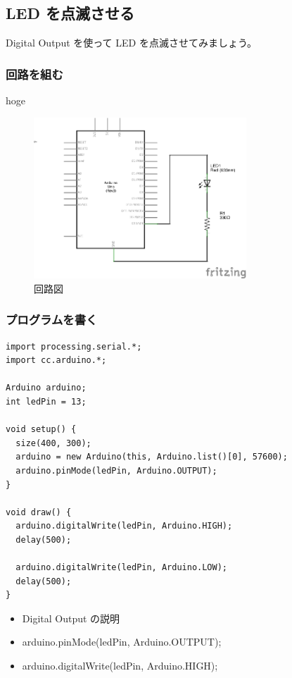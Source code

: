 \documentclass[11pt,a4paper]{jarticle}
\begin{document}
\subsection*{LED を点滅させる}
Digital Output を使って LED を点滅させてみましょう。

\subsubsection*{回路を組む}
hoge

\begin{figure}[h!]
 \centering
 \includegraphics[width=80mm]{img/02_led.eps}
 \caption{回路図}
\end{figure}

\subsubsection*{プログラムを書く}
\begin{lstlisting}
import processing.serial.*;
import cc.arduino.*;
 
Arduino arduino;
int ledPin = 13;
 
void setup() {
  size(400, 300);
  arduino = new Arduino(this, Arduino.list()[0], 57600);
  arduino.pinMode(ledPin, Arduino.OUTPUT);
}
 
void draw() {
  arduino.digitalWrite(ledPin, Arduino.HIGH);
  delay(500);
  
  arduino.digitalWrite(ledPin, Arduino.LOW);
  delay(500);  
}
\end{lstlisting}

\begin{itemize}
 \item Digital Output の説明
 \item arduino.pinMode(ledPin, Arduino.OUTPUT);
 \item arduino.digitalWrite(ledPin, Arduino.HIGH);
\end{itemize}
\end{document}
